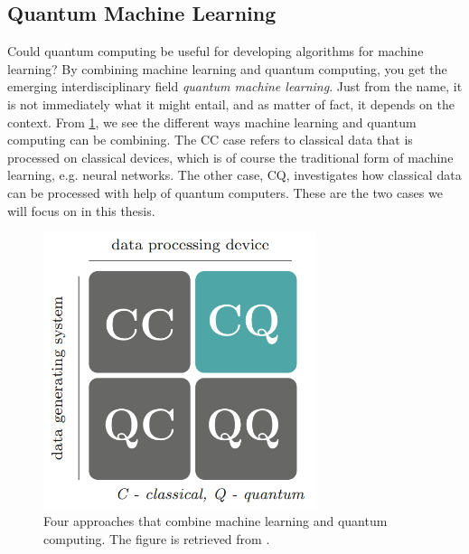 \subsection{Quantum Machine Learning}\label{sec:Quantum Machine Learning}
Could quantum computing be useful for developing algorithms for machine learning? By combining machine learning and quantum computing, you get the emerging interdisciplinary field \emph{quantum machine learning}. Just from the name, it is not immediately what it might entail, and as matter of fact, it depends on the context. From \cref{fig:cccq}, we see the different ways machine learning and quantum computing can be combining. The CC case refers to classical data that is processed on classical devices, which is of course the traditional form of machine learning, e.g. neural networks. The other case, CQ, investigates how classical data can be processed with help of quantum computers. These are the two cases we will focus on in this thesis.

\begin{figure}[htp]
    \centering
    \includegraphics[width=8cm]{latex/figures/cccq.PNG}
    \caption{Four approaches that combine machine learning and quantum computing. The figure is retrieved from \citet{SupervisedwquantumComputers}.}
    \label{fig:cccq}
\end{figure}


